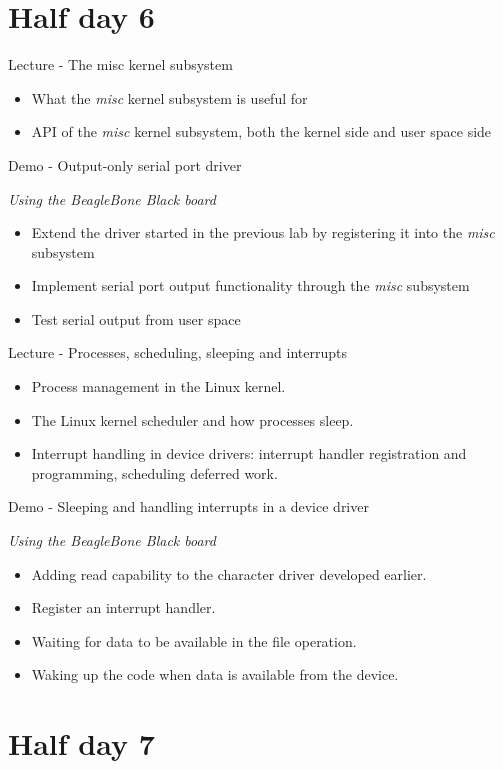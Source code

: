 \documentclass[a4paper,12pt,obeyspaces,spaces,hyphens]{article}
\begin{document}
\section{Half day 6}

\feagendatwocolumn
{Lecture - The misc kernel subsystem}
{
  \begin{itemize}
  \item What the {\em misc} kernel subsystem is useful for
  \item API of the {\em misc} kernel subsystem, both the kernel side
    and user space side
  \end{itemize}
}
{Demo - Output-only serial port driver}
{
  {\em Using the BeagleBone Black board}
  \begin{itemize}
  \item Extend the driver started in the previous lab by registering
    it into the {\em misc} subsystem
  \item Implement serial port output functionality through the {\em
      misc} subsystem
  \item Test serial output from user space
  \end{itemize}
}

\feagendatwocolumn
{Lecture - Processes, scheduling, sleeping and interrupts}
{
  \begin{itemize}
  \item Process management in the Linux kernel.
  \item The Linux kernel scheduler and how processes sleep.
  \item Interrupt handling in device drivers: interrupt handler
    registration and programming, scheduling deferred work.
  \end{itemize}
}
{Demo - Sleeping and handling interrupts in a device driver}
{
  {\em Using the BeagleBone Black board}
  \begin{itemize}
  \item Adding read capability to the character driver developed
    earlier.
  \item Register an interrupt handler.
  \item Waiting for data to be available in the  file operation.
  \item Waking up the code when data is available from the device.
  \end{itemize}
}

\section{Half day 7}
\end{document}
